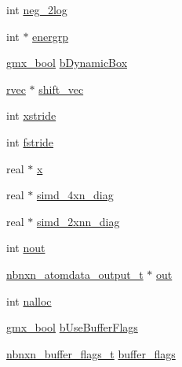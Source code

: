 \begin{DoxyCompactItemize}
\item 
int \hyperlink{structnbnxn__atomdata__t_a0c3f4ef8eb114389b57b595647e29eda}{neg\-\_\-2log}
\item 
int $\ast$ \hyperlink{structnbnxn__atomdata__t_ae8887ae935a1e91ad88fdac8f0f43263}{energrp}
\item 
\hyperlink{include_2types_2simple_8h_a8fddad319f226e856400d190198d5151}{gmx\-\_\-bool} \hyperlink{structnbnxn__atomdata__t_ad9dc9f3d71a6b27072721ba7884c6311}{b\-Dynamic\-Box}
\item 
\hyperlink{share_2template_2gromacs_2types_2simple_8h_aa02a552a4abd2f180c282a083dc3a999}{rvec} $\ast$ \hyperlink{structnbnxn__atomdata__t_a58729b28df2a5b149737699408388e36}{shift\-\_\-vec}
\item 
int \hyperlink{structnbnxn__atomdata__t_a5634643d3ae35f871a7ed3ba15cd9132}{xstride}
\item 
int \hyperlink{structnbnxn__atomdata__t_a4292f300a3671bfad9dc0eb89ba4c701}{fstride}
\item 
real $\ast$ \hyperlink{structnbnxn__atomdata__t_ad0547d95e2a9ebe3d07de4e5ecb1bf2e}{x}
\item 
real $\ast$ \hyperlink{structnbnxn__atomdata__t_ad1fc9b7be341f2292ea61e7a0b71ede4}{simd\-\_\-4xn\-\_\-diag}
\item 
real $\ast$ \hyperlink{structnbnxn__atomdata__t_a03741d489ff0c26e08669f99b0005559}{simd\-\_\-2xnn\-\_\-diag}
\item 
int \hyperlink{structnbnxn__atomdata__t_aa7826a0453cf3a3d7a924e85ead15ef4}{nout}
\item 
\hyperlink{structnbnxn__atomdata__output__t}{nbnxn\-\_\-atomdata\-\_\-output\-\_\-t} $\ast$ \hyperlink{structnbnxn__atomdata__t_aabe1cb0183bdf2911ab49d1f2d4dcd59}{out}
\item 
int \hyperlink{structnbnxn__atomdata__t_ac65b28df2e3f76efba13d8121b3d97d2}{nalloc}
\item 
\hyperlink{include_2types_2simple_8h_a8fddad319f226e856400d190198d5151}{gmx\-\_\-bool} \hyperlink{structnbnxn__atomdata__t_a83814abb0d9b9a06268e45594b481618}{b\-Use\-Buffer\-Flags}
\item 
\hyperlink{structnbnxn__buffer__flags__t}{nbnxn\-\_\-buffer\-\_\-flags\-\_\-t} \hyperlink{structnbnxn__atomdata__t_a73398b78b1d51ca41d68fe3f1cb70743}{buffer\-\_\-flags}
\end{DoxyCompactItemize}


